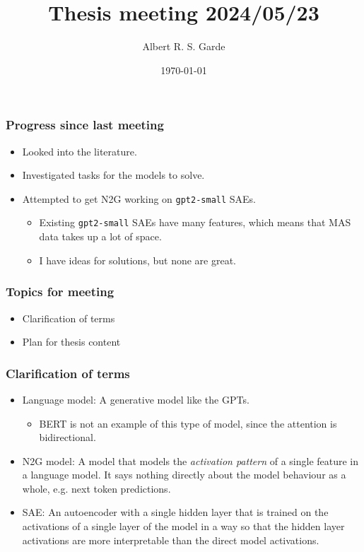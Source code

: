 \documentclass[aspectratio=169]{beamer}
\title{Thesis meeting 2024/05/23}
\author{Albert R. S. Garde}
\date{\today}
\begin{document}
\frame{
	\maketitle
}

\begin{frame}[fragile=singleslide]
	\frametitle{Progress since last meeting}
    \begin{itemize}
        \item Looked into the literature.
        \item Investigated tasks for the models to solve.
        \item Attempted to get N2G working on \verb|gpt2-small| SAEs.
        \begin{itemize}
            \item Existing \verb|gpt2-small| SAEs have many features, which means that MAS data takes up a lot of space.
            \item I have ideas for solutions, but none are great.
        \end{itemize}
    \end{itemize}
\end{frame}
\begin{frame}[fragile=singleslide]
    \frametitle{Topics for meeting}
    \begin{itemize}
        \item Clarification of terms
        \item Plan for thesis content
    \end{itemize}
\end{frame}
\begin{frame}[fragile=singleslide]
    \frametitle{Clarification of terms}
    \begin{itemize}
        \item Language model: A generative model like the GPTs. 
        \begin{itemize}
            \item BERT is not an example of this type of model, since the attention is bidirectional.
        \end{itemize}
        \item N2G model: A model that models the \emph{activation pattern} of a single feature in a language model.
        It says nothing directly about the model behaviour as a whole, e.g. next token predictions.
        \item SAE: An autoencoder with a single hidden layer that is trained on the activations of a single layer of the model 
        in a way so that the hidden layer activations are more interpretable than the direct model activations.
    \end{itemize}
\end{frame}
\end{document}
